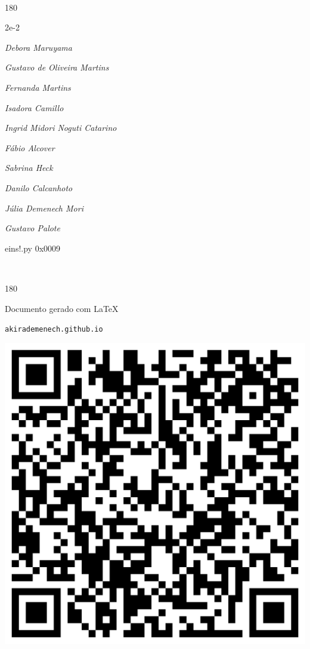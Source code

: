 \documentclass[12pt]{article}
\begin{document}
	\ 
	\vfill
	\begin{turn}{180}	
		\begin{minipage}{\textwidth}
		  	\ttfamily %
			\centering
			{\Huge 2e-2}
		  
			\hfill
		  
			

\textit{\small Debora Maruyama}

\textit{\small Gustavo de Oliveira Martins}

\textit{\small Fernanda Martins}

\textit{\small Isadora Camillo}

\textit{\small Ingrid Midori Noguti Catarino}

\textit{\small Fábio Alcover}

\textit{\small Sabrina Heck}

\textit{\small Danilo Calcanhoto}

\textit{\small Júlia Demenech Mori}

\textit{\small Gustavo Palote}

\bigskip

eins!.py
0x0009


		\end{minipage}	
	\end{turn}
	\vfill
	\

\pagebreak

	\begin{turn}{180}	
		\begin{minipage}{\textwidth}		  
		  Documento gerado com \LaTeX			
		  
		  \texttt{akirademenech.github.io}

		  \includegraphics[height=0.3\textheight]{2e-2.pdf}

		\end{minipage}	
	\end{turn}  
		  
\end{document}
